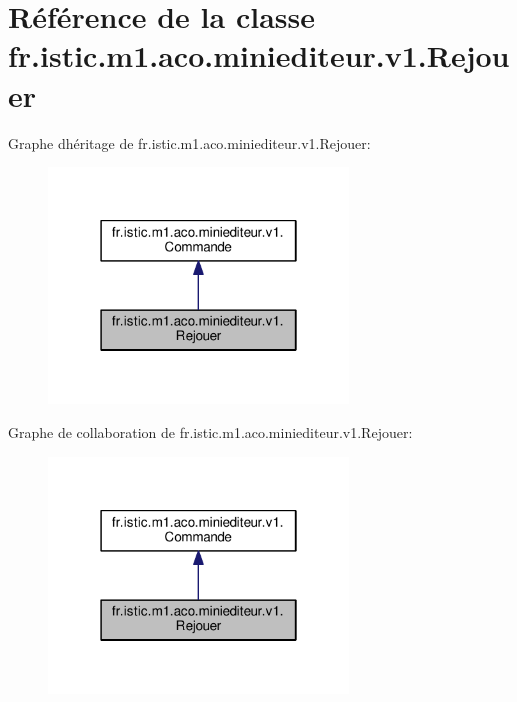 \hypertarget{classfr_1_1istic_1_1m1_1_1aco_1_1miniediteur_1_1v1_1_1Rejouer}{}\section{Référence de la classe fr.\+istic.\+m1.\+aco.\+miniediteur.\+v1.\+Rejouer}
\label{classfr_1_1istic_1_1m1_1_1aco_1_1miniediteur_1_1v1_1_1Rejouer}


Graphe d\textquotesingle{}héritage de fr.\+istic.\+m1.\+aco.\+miniediteur.\+v1.\+Rejouer\+:\nopagebreak
\begin{figure}[H]
\begin{center}
\leavevmode
\includegraphics[width=226pt]{classfr_1_1istic_1_1m1_1_1aco_1_1miniediteur_1_1v1_1_1Rejouer__inherit__graph}
\end{center}
\end{figure}


Graphe de collaboration de fr.\+istic.\+m1.\+aco.\+miniediteur.\+v1.\+Rejouer\+:\nopagebreak
\begin{figure}[H]
\begin{center}
\leavevmode
\includegraphics[width=226pt]{classfr_1_1istic_1_1m1_1_1aco_1_1miniediteur_1_1v1_1_1Rejouer__coll__graph}
\end{center}
\end{figure}
